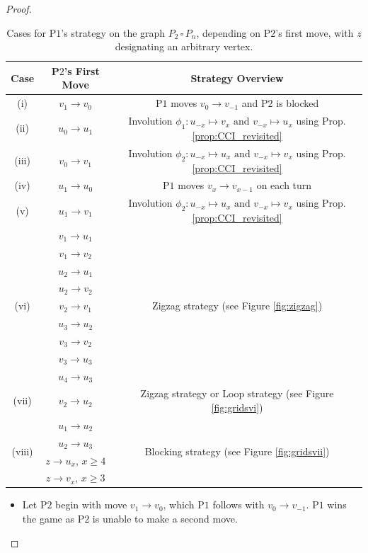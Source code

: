 \documentclass{article}
\theoremstyle{plain}
\theoremstyle{definition}
\def\pone{{\rm{P}\ensuremath{1}}}
\def\ptwo{{\rm{P}\ensuremath{2}}}
\def\poneposs{{\rm{P}\ensuremath{1}'s}}
\def\ptwoposs{{\rm{P}\ensuremath{2}'s}}
\begin{document}
\begin{proof}
\begin{table}[ht]
\centering
\begin{tabular}{ |c||c|c| } 
\hline
Case & \ptwoposs{} First Move & Strategy Overview \\ 
\hline \hline
\multirow{1}{1cm}{(i)} & $v_{1} \to v_{0}$  & \multirow{1}{8.5cm}{\pone{} moves $v_0 \to v_{-1}$ and \ptwo{} is blocked} \\ 
\hline
\multirow{1}{1cm}{(ii)} & $u_0 \to u_{1}$  & \multirow{1}{8.5cm}{Involution $\phi_1: u_{-x} \mapsto v_{x} \text{ and } v_{-x} \mapsto u_{x}$ using Prop. \ref{prop:CCI_revisited}}\\  
\hline
\multirow{1}{1cm}{(iii)} & $v_0 \to v_{1}$  & \multirow{1}{8.5cm}{Involution $\phi_2: u_{-x} \mapsto u_{x} \text{ and } v_{-x} \mapsto v_{x}$ using Prop. \ref{prop:CCI_revisited}}\\ 
\hline
\multirow{1}{1cm}{(iv)} & $u_{1} \to u_0$  & \multirow{1}{8.5cm}{\pone{} moves $v_{x} \to v_{x-1}$ on each turn} \\
\hline
\multirow{1}{1cm}{(v)} & $u_{1} \to v_{1}$  & \multirow{1}{8.5cm}{Involution $\phi_2: u_{-x} \mapsto u_{x} \text{ and } v_{-x} \mapsto v_{x}$ using Prop. \ref{prop:CCI_revisited}} \\
\hline
\multirow{9}{1cm}{(vi)} & $v_{1} \to u_{1}$  & \multirow{9}{8.5cm}{Zigzag strategy (see Figure \ref{fig:zigzag})} \\
& $v_{1} \to v_{2}$  & \\
& $u_{2} \to u_{1}$  & \\
& $u_{2} \to v_{2}$  & \\
& $v_{2} \to v_{1}$  & \\
& $u_{3} \to u_{2}$  & \\
& $v_{3} \to v_{2}$  & \\
& $v_{3} \to u_{3}$  & \\
& $u_{4} \to u_{3}$  & \\
\hline
\multirow{1}{1cm}{(vii)} & $v_{2} \to u_{2}$  & \multirow{1}{8.5cm}{Zigzag strategy or Loop strategy (see Figure \ref{fig:gridsvi})} \\
\hline
\multirow{4}{1cm}{(viii)} & $u_{1} \to u_{2}$ & \multirow{4}{8.5cm}{Blocking strategy (see Figure \ref{fig:gridsvii})}\\
& $u_{2} \to u_{3}$ & \\
& $z \to u_{x}$, $x \ge 4$ & \\
& $z \to v_{x}$, $x \ge 3$ & \\
\hline
\end{tabular}
\caption{Cases for \poneposs{} strategy on the graph $P_2 \,\square \, P_n$, depending on \ptwoposs{} first move, with $z$ designating an arbitrary vertex.}
\label{table:gridgraphcases}
\end{table}
\begin{itemize}
\item [(i)] Let \ptwo{} begin with move $v_{1} \to v_{0}$, which \pone{} follows with $v_0 \to v_{-1}$. \pone{} wins the game as \ptwo{} is unable to make a second move. 


\end{itemize}
\end{proof}
\end{document}
